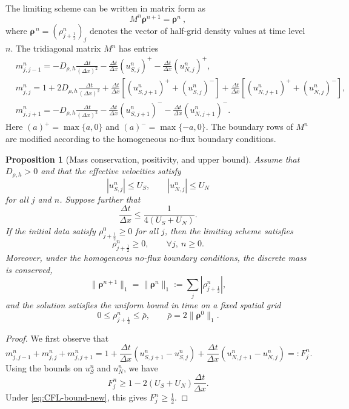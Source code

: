 \documentclass[11pt,twoside]{article}
\numberwithin{equation}{section}
\theoremstyle{plain}
\newtheorem{proposition}[theorem]{Proposition}
\theoremstyle{nonumberplain}
\newtheorem{proof}{Proof.-}
\newcommand{\brho}{\boldsymbol{\rho}}
\begin{document}
{{%

The limiting scheme can be written in matrix form as
\[
M^n\brho^{n+1}=\brho^n \ ,
\]
where
 $\boldsymbol{\rho}^{\,n}
=
(\rho_{j+\frac12}^n)_j$
denotes the vector of half-grid density values at time level $n$.
The tridiagonal matrix $M^n$ has entries
\begin{align*}
&m_{j,j-1}^n
=
-D_{\rho,h}\frac{\Delta t}{(\Delta x)^2}
-\frac{\Delta t}{\Delta x}(u_{S,j}^n)^+
-\frac{\Delta t}{\Delta x}(u_{N,j}^n)^+,\\
&m_{j,j}^n
=
1+2D_{\rho,h}\frac{\Delta t}{(\Delta x)^2}
+\frac{\Delta t}{\Delta x}
\left[(u_{S,j+1}^n)^+ +(u_{S,j}^n)^-\right]
+\frac{\Delta t}{\Delta x}
\left[(u_{N,j+1}^n)^+ +(u_{N,j}^n)^-\right],\\
&m_{j,j+1}^n
=
-D_{\rho,h}\frac{\Delta t}{(\Delta x)^2}
-\frac{\Delta t}{\Delta x}(u_{S,j+1}^n)^-
-\frac{\Delta t}{\Delta x}(u_{N,j+1}^n)^- .
\end{align*}
Here $(a)^+=\max\{a,0\}$ and $(a)^-=\max\{-a,0\}$.
The boundary rows of \(M^n\) are modified according to the homogeneous
no-flux boundary conditions.


\begin{proposition}[Mass conservation, positivity, and upper bound]
Assume that $D_{\rho,h}>0$ and that the effective velocities satisfy
\[
|u_{S,j}^n|\le U_S,\qquad |u_{N,j}^n|\le U_N
\]
for all $j$ and $n$. Suppose further that
\begin{equation}\label{eq:CFL-bound-new}
\frac{\Delta t}{\Delta x}
\le
\frac{1}{4(U_S+U_N)} .
\end{equation}
If the initial data satisfy $\rho_{j+\frac12}^0\ge0$ for all $j$, then the
limiting scheme satisfies
\[
\rho_{j+\frac12}^n\ge0,\qquad \forall j,\ n\ge0.
\]
Moreover, under the homogeneous no-flux boundary conditions, the discrete
mass is conserved,
\[
\|\brho^{n+1}\|_1=\|\brho^n\|_1 := \sum_j|\rho^n_{j+\frac12}|,
\]
and the solution satisfies the uniform bound in time on a fixed spatial grid
\[
0\le \rho_{j+\frac12}^n\le \bar\rho,\qquad
\bar\rho=2\|\brho^0\|_1 .
\]
\end{proposition}

\begin{proof}{\rm
We first observe that
\[
m_{j,j-1}^n+m_{j,j}^n+m_{j,j+1}^n
=
1+\frac{\Delta t}{\Delta x}
\left(u_{S,j+1}^n-u_{S,j}^n\right)
+\frac{\Delta t}{\Delta x}
\left(u_{N,j+1}^n-u_{N,j}^n\right)
=:F_j^n .
\]
Using the bounds on $u_S^n$ and $u_N^n$, we have
\[
F_j^n
\ge
1-2(U_S+U_N)\frac{\Delta t}{\Delta x}.
\]
Under \eqref{eq:CFL-bound-new}, this gives
$
F_j^n\ge \frac12 .
$

}
\end{proof}}}
\end{document}

